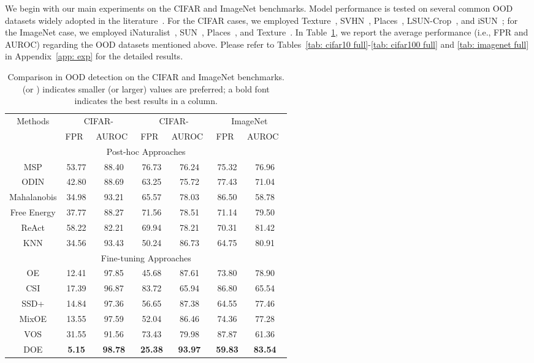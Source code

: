\documentclass{article} \usepackage{iclr2022_conference,times}
\begin{document}
We begin with our main experiments on the CIFAR and ImageNet benchmarks. Model performance is tested on several common OOD datasets widely adopted in the literature~\citep{SunM0L22}. For the CIFAR cases, we employed Texture~\citep{cimpoi2014describing}, SVHN~\citep{netzer2011reading}, Places~\citep{ZhouLKO018}, LSUN-Crop~\citep{yu2015lsun}, and iSUN~\citep{xu2015turkergaze}; for the ImageNet case, we employed iNaturalist~\citep{HornASCSSAPB18}, SUN~\citep{xu2015turkergaze}, Places~\citep{ZhouLKO018}, and Texture~\citep{cimpoi2014describing}. In Table~\ref{tab: cifar&imagenet}, we report the average performance (i.e., FPR and AUROC) regarding the OOD datasets mentioned above. Please refer to Tables~\ref{tab: cifar10 full}-\ref{tab: cifar100 full} and \ref{tab: imagenet full} in Appendix~\ref{app: exp} for the detailed results. 



\begin{table}[t]
\caption{Comparison in OOD detection on the CIFAR and ImageNet benchmarks.  (or ) indicates smaller (or larger) values are preferred; a bold font indicates the best results in a column.} \label{tab: cifar&imagenet}
\small
\centering
\begin{tabular}{c|cc|cc|cc}
\toprule[1.5pt]
\multirow{2}{*}{Methods} & \multicolumn{2}{c|}{CIFAR-} & \multicolumn{2}{c}{CIFAR-} & \multicolumn{2}{|c}{ImageNet}\\
\cline{2-7} 
         & FPR~ & AUROC~  & FPR~ & AUROC~ & FPR~ & AUROC~ \\
\midrule[1pt]
\multicolumn{7}{c}{Post-hoc Approaches} \\
\midrule[0.6pt]
MSP   & 53.77 & 88.40 & 76.73 & 76.24 & 75.32 & 76.96 \\
ODIN  & 42.80 & 88.69 & 63.25 & 75.72 & 77.43 & 71.04 \\  
Mahalanobis 
      & 34.98 & 93.21 & 65.57 & 78.03 & 86.50 & 58.78 \\
Free Energy 
      & 37.77 & 88.27 & 71.56 & 78.51 & 71.14 & 79.50 \\
ReAct & 58.22 & 82.21 & 69.94 & 78.21 & 70.31 & 81.42 \\
KNN   & 34.56 & 93.43 & 50.24 & 86.73 & 64.75 & 80.91 \\    
\midrule[0.6pt]
\multicolumn{7}{c}{{Fine-tuning Approaches}} \\
\midrule[0.6pt]
OE    & 12.41 & 97.85 & 45.68 & 87.61 & 73.80 & 78.90 \\
CSI   & 17.39 & 96.87 & 83.72 & 65.94 & 86.80 & 65.54 \\
SSD+  & 14.84 & 97.36 & 56.65 & 87.38 & 64.55 & 77.46 \\
MixOE & 13.55 & 97.59 & 52.04 & 86.46 & 74.36 & 77.28 \\
VOS   & 31.55 & 91.56 & 73.43 & 79.98 & 87.87 & 61.36 \\
\hline
DOE   & \textbf{5.15} & \textbf{98.78} & \textbf{25.38} & \textbf{93.97} & \textbf{59.83} & \textbf{83.54} \\
\bottomrule[1.5pt]   
\end{tabular}
\end{table}
\end{document}
